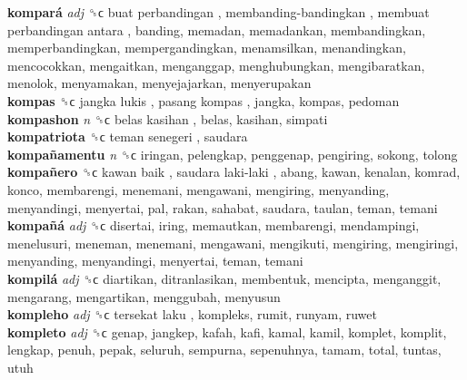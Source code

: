 \textbf{kompará} \emph{adj}  ␝ϲ   buat perbandingan ,  membanding-bandingkan ,  membuat perbandingan antara , banding, memadan, memadankan, membandingkan, memperbandingkan, mempergandingkan, menamsilkan, menandingkan, mencocokkan, mengaitkan, menganggap, menghubungkan, mengibaratkan, menolok, menyamakan, menyejajarkan, menyerupakan  \\
\textbf{kompas} ␝ϲ   jangka lukis ,  pasang kompas , jangka, kompas, pedoman  \\
\textbf{kompashon} \emph{n}  ␝ϲ   belas kasihan , belas, kasihan, simpati  \\
\textbf{kompatriota} ␝ϲ   teman senegeri , saudara  \\
\textbf{kompañamentu} \emph{n}  ␝ϲ  iringan, pelengkap, penggenap, pengiring, sokong, tolong  \\
\textbf{kompañero} ␝ϲ   kawan baik ,  saudara laki-laki , abang, kawan, kenalan, komrad, konco, membarengi, menemani, mengawani, mengiring, menyanding, menyandingi, menyertai, pal, rakan, sahabat, saudara, taulan, teman, temani  \\
\textbf{kompañá} \emph{adj}  ␝ϲ  disertai, iring, memautkan, membarengi, mendampingi, menelusuri, meneman, menemani, mengawani, mengikuti, mengiring, mengiringi, menyanding, menyandingi, menyertai, teman, temani  \\
\textbf{kompilá} \emph{adj}  ␝ϲ  diartikan, ditranlasikan, membentuk, mencipta, menganggit, mengarang, mengartikan, menggubah, menyusun  \\
\textbf{kompleho} \emph{adj}  ␝ϲ   tersekat laku , kompleks, rumit, runyam, ruwet  \\
\textbf{kompleto} \emph{adj}  ␝ϲ  genap, jangkep, kafah, kafi, kamal, kamil, komplet, komplit, lengkap, penuh, pepak, seluruh, sempurna, sepenuhnya, tamam, total, tuntas, utuh  \\
